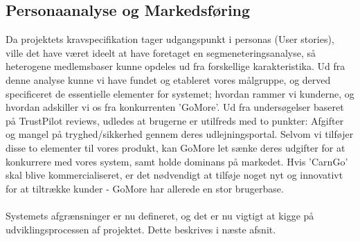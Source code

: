 \documentclass[Rapport/Rapport_main.tex]{subfiles}
\begin{document}
\subsection{Personaanalyse og Markedsføring}
Da projektets kravspecifikation tager udgangspunkt i personas (User stories), ville det have været ideelt at have foretaget en segmeneteringsanalyse, så heterogene medlemsbaser kunne opdeles ud fra forskellige karakteristika. Ud fra denne analyse kunne vi have fundet og etableret vores målgruppe, og derved specificeret de essentielle elementer for systemet; hvordan rammer vi kunderne, og hvordan adskiller vi os fra konkurrenten 'GoMore'. Ud fra undersøgelser baseret på TrustPilot reviews, udledes at brugerne er utilfreds med to punkter: Afgifter og mangel på tryghed/sikkerhed gennem deres udlejningsportal. Selvom vi tilføjer disse to elementer til vores produkt, kan GoMore let sænke deres udgifter for at konkurrere med vores system, samt holde dominans på markedet. Hvis 'CarnGo' skal blive kommercialiseret, er det nødvendigt at tilføje noget nyt og innovativt for at tiltrække kunder - GoMore har allerede en stor brugerbase. \\\\
Systemets afgrænsninger er nu defineret, og det er nu vigtigt at kigge på udviklingsprocessen af projektet. Dette beskrives i næste afsnit. 
\end{document}
